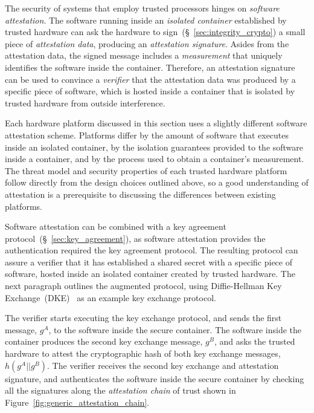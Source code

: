 \label{sec:generic_software_attestation}

The security of systems that employ trusted processors hinges on
\textit{software attestation}. The software running inside an \textit{isolated
container} established by trusted hardware can ask the hardware to
sign~(\S~\ref{sec:integrity_crypto}) a small piece of \textit{attestation
data}, producing an \textit{attestation signature}. Asides from the attestation
data, the signed message includes a \textit{measurement} that uniquely
identifies the software inside the container. Therefore, an attestation
signature can be used to convince a \textit{verifier} that the attestation data
was produced by a specific piece of software, which is hosted inside a
container that is isolated by trusted hardware from outside interference.

Each hardware platform discussed in this section uses a slightly different
software attestation scheme. Platforms differ by the amount of software that
executes inside an isolated container, by the isolation guarantees provided to
the software inside a container, and by the process used to obtain a
container's measurement. The threat model and security properties of each
trusted hardware platform follow directly from the design choices outlined
above, so a good understanding of attestation is a prerequisite to discussing
the differences between existing platforms.



Software attestation can be combined with a key agreement
protocol~(\S~\ref{sec:key_agreement}), as software attestation provides the
authentication required the key agreement protocol. The resulting protocol can
assure a verifier that it has established a shared secret with a specific piece
of software, hosted inside an isolated container created by trusted hardware.
The next paragraph outlines the augmented protocol, using Diffie-Hellman Key
Exchange~(DKE)~\cite{diffie1976keyexchange} as an example key exchange
protocol.

The verifier starts executing the key exchange protocol, and sends the first
message, $g^{A}$, to the software inside the secure container. The software
inside the container produces the second key exchange message, $g^{B}$, and
asks the trusted hardware to attest the cryptographic hash of both key exchange
messages, $h(g^{A} || g^{B})$. The verifier receives the second key exchange
and attestation signature, and authenticates the software inside the secure
container by checking all the signatures along the \textit{attestation chain}
of trust shown in Figure~\ref{fig:generic_attestation_chain}.

